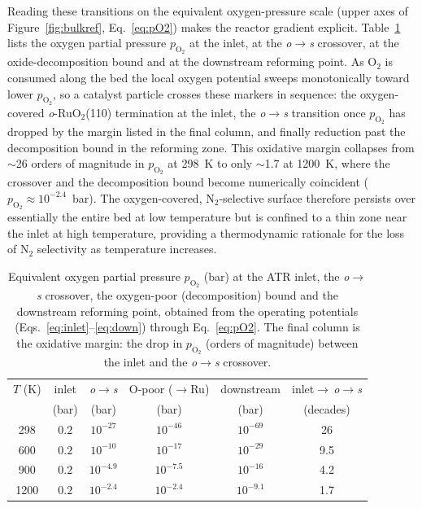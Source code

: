 Reading these transitions on the equivalent oxygen-pressure scale (upper axes of
Figure~\ref{fig:bulkref}, Eq.~\eqref{eq:pO2}) makes the reactor gradient
explicit. Table~\ref{tab:po2markers} lists the oxygen partial pressure
$p_{\mathrm{O_2}}$ at the inlet, at the \textit{o}$\rightarrow$\textit{s}
crossover, at the oxide-decomposition bound and at the downstream reforming
point. As O$_2$ is consumed along the bed the local oxygen potential sweeps
monotonically toward lower $p_{\mathrm{O_2}}$, so a catalyst particle crosses
these markers in sequence: the oxygen-covered \textit{o}-RuO$_2$(110)
termination at the inlet, the \textit{o}$\rightarrow$\textit{s} transition once
$p_{\mathrm{O_2}}$ has dropped by the margin listed in the final column, and
finally reduction past the decomposition bound in the reforming zone. This
oxidative margin collapses from $\sim$26 orders of magnitude in
$p_{\mathrm{O_2}}$ at 298~K to only $\sim$1.7 at 1200~K, where the crossover and
the decomposition bound become numerically coincident
($p_{\mathrm{O_2}}\approx10^{-2.4}$~bar). The oxygen-covered, N$_2$-selective
surface therefore persists over essentially the entire bed at low temperature
but is confined to a thin zone near the inlet at high temperature, providing a
thermodynamic rationale for the loss of N$_2$ selectivity as temperature
increases.

\begin{table}[htbp]
  \centering
  \caption{Equivalent oxygen partial pressure $p_{\mathrm{O_2}}$ (bar) at the
  ATR inlet, the \textit{o}$\rightarrow$\textit{s} crossover, the oxygen-poor
  (decomposition) bound and the downstream reforming point, obtained from the
  operating potentials (Eqs.~\eqref{eq:inlet}--\eqref{eq:down}) through
  Eq.~\eqref{eq:pO2}. The final column is the oxidative margin: the drop in
  $p_{\mathrm{O_2}}$ (orders of magnitude) between the inlet and the
  \textit{o}$\rightarrow$\textit{s} crossover.}
  \label{tab:po2markers}
  \begin{tabular}{cccccc}
    \hline
    $T$ (K) & inlet & \textit{o}$\rightarrow$\textit{s} &
    O-poor ($\rightarrow$Ru) & downstream &
    inlet$\rightarrow$\,\textit{o}$\rightarrow$\textit{s} \\
     & (bar) & (bar) & (bar) & (bar) & (decades) \\
    \hline
    298  & $0.2$ & $10^{-27}$  & $10^{-46}$  & $10^{-69}$  & 26  \\
    600  & $0.2$ & $10^{-10}$  & $10^{-17}$  & $10^{-29}$  & 9.5 \\
    900  & $0.2$ & $10^{-4.9}$ & $10^{-7.5}$ & $10^{-16}$  & 4.2 \\
    1200 & $0.2$ & $10^{-2.4}$ & $10^{-2.4}$ & $10^{-9.1}$ & 1.7 \\
    \hline
  \end{tabular}
\end{table}

